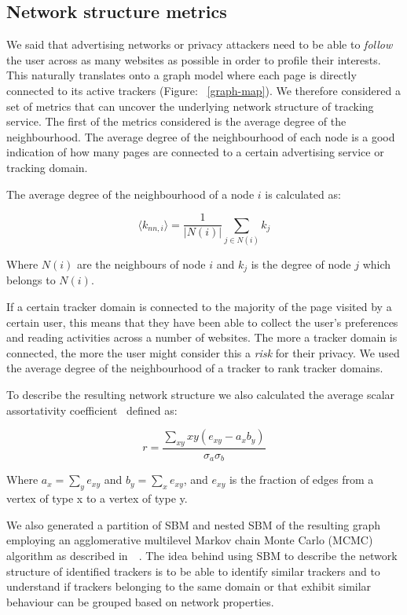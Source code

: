 \subsection{Network structure metrics}

We said that advertising networks or privacy attackers need to be able to \emph{follow} the user across as many websites as possible in order to profile their interests. This naturally translates onto a graph model where each page is directly connected to its active trackers (Figure: ~\ref{graph-map}).  
We therefore considered a set of metrics that can uncover the underlying network structure of tracking service. The first of the metrics considered is the average degree of the neighbourhood. The average degree of the neighbourhood of each node is a good indication of how many pages are connected to a certain advertising service or tracking domain.

The average degree of the neighbourhood of a node $i$ is calculated as:

$$ \langle k_{nn,i} \rangle= \frac{1}{| N(i) |} \sum_{j \in N(i) } {k_j} $$

Where $N(i)$ are the neighbours of node $i$ and $k_j$ is the degree of node $j$ which belongs to $N(i)$.

If a certain tracker domain is connected to the majority of the page visited by a certain user, this means that they have been able to collect the user's preferences and reading activities across a number of websites. The more a tracker domain is connected, the more the user might consider this a \emph{risk} for their privacy. We used the average degree of the neighbourhood of a tracker to rank tracker domains.

To describe the resulting network structure we also calculated the average scalar assortativity coefficient~\cite{newman2002assortative} defined as:

$$ r = \frac{\sum_{xy} xy(e_{xy} - a_x b_y)}{\sigma_a\sigma_b} $$   

Where $a_x=\sum_ye_{xy}$ and $b_y=\sum_xe_{xy}$, and $e_{xy}$ is the fraction of edges from a vertex of type x to a vertex of type y.

We also generated a partition of SBM and nested SBM of the resulting graph employing an agglomerative multilevel Markov chain Monte Carlo (MCMC) algorithm as described in~\cite{peixoto2014efficient}~\cite{peixoto2013parsimonious}\cite{peixoto2012entropy}. The idea behind using SBM to describe the network structure of identified trackers is to be able to identify similar trackers and to understand if trackers belonging to the same domain or that exhibit similar behaviour can be grouped based on network properties.

